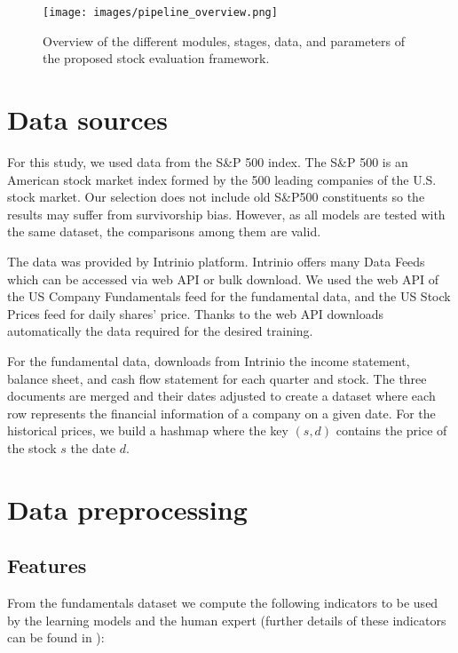 
\begin{figure}
    \centering
    \texttt{[image: images/pipeline\_overview.png]}
    \caption{Overview of the different modules, stages, data, and parameters of the proposed stock evaluation framework.}
    \label{fig:pipeline}
\end{figure}

\section{Data sources}

For this study, we used data from the S\&P 500 index. The S\&P 500 is an American stock market index formed by the 500 leading companies of the U.S. stock market. %
Our selection does not include old S\&P500 constituents so the results may suffer from survivorship bias. However, as all models are tested with the same dataset, the comparisons among them are valid.

The data was provided by Intrinio platform. Intrinio offers many Data Feeds which can be accessed via web API or bulk download. We used the web API of the US Company Fundamentals feed for the fundamental data, and the US Stock Prices feed for daily shares' price. Thanks to the web API \HPCsys downloads automatically the data required for the desired training.

For the fundamental data, \HPCsys downloads from Intrinio the income statement, balance sheet, and cash flow statement for each quarter and stock. The three documents are merged and their dates adjusted to create a dataset where each row represents the financial information of a company on a given date.
For the historical prices, we build a hashmap where the key $(s, d)$ contains the price of the stock $s$ the date $d$.


\section{Data preprocessing}

\subsection{Features}

From the fundamentals dataset we compute the following indicators to be used by the learning models and the human expert (further details of these indicators can be found in \cite[Ch. 6.2]{AA14}):


